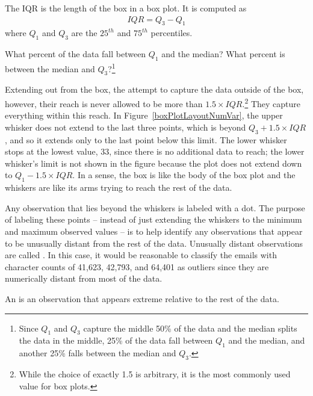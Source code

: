 \begin{termBox}{
The IQR is the length of the box in a box plot. It is computed as
\begin{eqnarray*}
IQR = Q_3 - Q_1
\end{eqnarray*}
where $Q_1$ and $Q_3$ are the $25^{th}$ and $75^{th}$ percentiles.}
\end{termBox}

\begin{exercise}
What percent of the data fall between $Q_1$ and the median? What percent is between the median and $Q_3$?\footnote{Since $Q_1$ and $Q_3$ capture the middle 50\% of the data and the median splits the data in the middle, 25\% of the data fall between $Q_1$ and the median, and another 25\% falls between the median and $Q_3$.}
\end{exercise}

Extending out from the box, the  attempt to capture the data outside of the box, however, their reach is never allowed to be more than $1.5\times IQR$.\footnote{While the choice of exactly 1.5 is arbitrary, it is the most commonly used value for box plots.} They capture everything within this reach. In Figure~\ref{boxPlotLayoutNumVar}, the upper whisker does not extend to the last three points, which is beyond $Q_3 + 1.5\times IQR$, and so it extends only to the last point below this limit. The lower whisker stops at the lowest value, 33, since there is no additional data to reach; the lower whisker's limit is not shown in the figure because the plot does not extend down to $Q_1 - 1.5\times IQR$. In a sense, the box is like the body of the box plot and the whiskers are like its arms trying to reach the rest of the data.

Any observation that lies beyond the whiskers is labeled with a dot. The purpose of labeling these points -- instead of just extending the whiskers to the minimum and maximum observed values -- is to help identify any observations that appear to be unusually distant from the rest of the data. Unusually distant observations are called . In this case, it would be reasonable to classify the emails with character counts of 41,623, 42,793, and 64,401 as outliers since they are numerically distant from most of the data.

\begin{termBox}{
An  is an observation that appears extreme relative to the rest of the data.}
\end{termBox}


